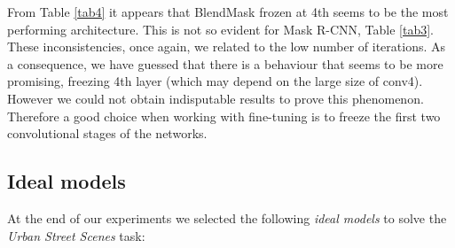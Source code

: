 \documentclass[10pt,twocolumn,letterpaper]{article}
\begin{document}
From Table \ref{tab4} it appears that BlendMask frozen at 4th seems to be the most performing architecture. This is not so evident for Mask R-CNN, Table \ref{tab3}. These inconsistencies, once again, we related to the low number of iterations. As a consequence, we have guessed that there is a behaviour that seems to be more promising, freezing 4th layer (which may depend on the large size of conv4). However we could not obtain indisputable results to prove this phenomenon. Therefore a good choice when working with fine-tuning is to freeze the first two convolutional stages of the networks.


\subsection{Ideal models}
At the end of our experiments we selected the following \textit{ideal models} to solve the \textit{Urban Street Scenes} task:
\end{document}
